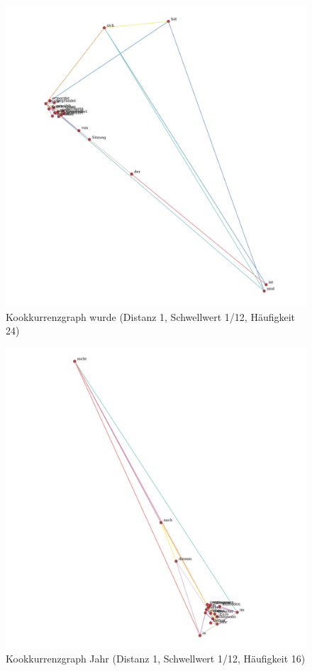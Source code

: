\documentclass[11pt, a4paper]{article}
\begin{document}
\begin{figure}[hp!]
    \centering
        \includegraphics[scale=.4]{../../data/results/cooc_denews10k/topwords/graph_wurde.pdf}
    \caption{Kookkurrenzgraph wurde (Distanz 1, Schwellwert 1/12, Häufigkeit 24)}
    \label{fig:hw-wurde}
\end{figure}

\begin{figure}[hp!]
    \centering
        \includegraphics[scale=.4]{../../data/results/cooc_denews10k/topwords/graph_Jahr.pdf}
    \caption{Kookkurrenzgraph Jahr (Distanz 1, Schwellwert 1/12, Häufigkeit 16)}
    \label{fig:hw-jahr}
\end{figure}
\end{document}
